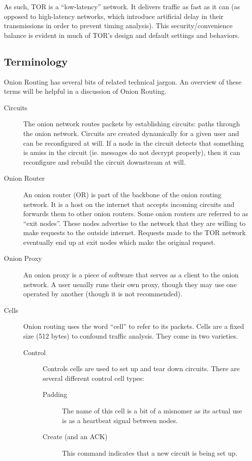 \documentclass[letterpaper, titlepage, 12pt]{article}
\begin{document}
As such, TOR is a ``low-latency'' network. It delivers traffic as fast as it can (as opposed to high-latency networks, which introduce artificial delay in their transmissions in order to prevent timing analysis). This security/convenience balance is evident in much of TOR's design and default settings and behaviors.

\subsection{Terminology}
Onion Routing has several bits of related technical jargon. An overview of these terms will be helpful in a discussion of Onion Routing.

\begin{description}
\item[Circuits] The onion network routes packets by establishing circuits: paths through the onion network. Circuits are created dynamically for a given user and can be reconfigured at will. If a node in the circuit detects that something is amiss in the circuit (ie. messages do not decrypt properly), then it can reconfigure and rebuild the circuit downstream at will.
\item[Onion Router] An onion router (OR) is part of the backbone of the onion routing network. It is a host on the internet that accepts incoming circuits and forwards them to other onion routers. Some onion routers are referred to as ``exit nodes''. These nodes advertise to the network that they are willing to make requests to the outside internet. Requests made to the TOR network eventually end up at exit nodes which make the original request.
\item[Onion Proxy] An onion proxy is a piece of software that serves as a client to the onion network. A user usually runs their own proxy, though they may use one operated by another (though it is not recommended).
\item[Cells] Onion routing uses the word ``cell'' to refer to its packets. Cells are a fixed size (512 bytes) to confound traffic analysis. They come in two varieties.
	\begin{description}
		\item[Control] Controls cells are used to set up and tear down circuits. There are several different control cell types:
		\begin{description}
			\item[Padding] The name of this cell is a bit of a misnomer as its actual use is as a heartbeat signal between nodes.
			\item[Create (and an ACK)] This command indicates that a new circuit is being set up.

\end{description}
\end{description}
\end{description}
\end{document}

